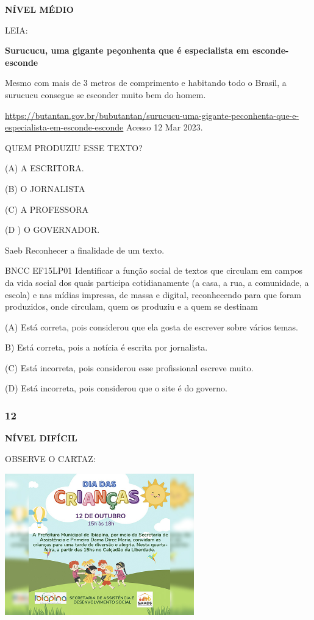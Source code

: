 \textbf{NÍVEL MÉDIO}

LEIA:

\textbf{Surucucu, uma gigante peçonhenta que é especialista em
esconde-esconde}

Mesmo com mais de 3 metros de comprimento e habitando todo o Brasil, a
surucucu consegue se esconder muito bem do homem.

\url{https://butantan.gov.br/bubutantan/surucucu-uma-gigante-peconhenta-que-e-especialista-em-esconde-esconde}
Acesso 12 Mar 2023.

QUEM PRODUZIU ESSE TEXTO?

(A) A ESCRITORA.

(B) O JORNALISTA

(C) A PROFESSORA

(D ) O GOVERNADOR.

Saeb Reconhecer a finalidade de um texto.

BNCC EF15LP01 Identificar a função social de textos que circulam em
campos da vida social dos quais participa cotidianamente (a casa, a rua,
a comunidade, a escola) e nas mídias impressa, de massa e digital,
reconhecendo para que foram produzidos, onde circulam, quem os produziu
e a quem se destinam

(A) Está correta, pois considerou que ela gosta de escrever sobre vários
temas.

B) Está correta, pois a notícia é escrita por jornalista.

(C) Está incorreta, pois considerou esse profissional escreve muito.

(D) Está incorreta, pois considerou que o site é do governo.

\subsubsection{12}\label{section-154}

\textbf{NÍVEL DIFÍCIL}

OBSERVE O CARTAZ:

\includegraphics[width=3.22436in,height=2.42060in]{media/image181.jpeg}

